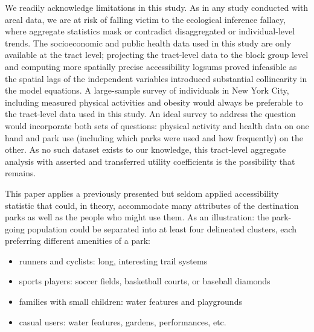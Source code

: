 \documentclass[Crown,sageh.bst]{sagej}
\begin{document}
We readily acknowledge limitations in this study. As in any study
conducted with areal data, we are at risk of falling victim to the
ecological inference fallacy, where aggregate statistics mask or
contradict disaggregated or individual-level trends. The socioeconomic
and public health data used in this study are only available at the
tract level; projecting the tract-level data to the block group level
and computing more spatially precise accessibility logsums proved
infeasible as the spatial lags of the independent variables introduced
substantial collinearity in the model equations. A large-sample survey
of individuals in New York City, including measured physical activities
and obesity would always be preferable to the tract-level data used in
this study. An ideal survey to address the question would incorporate
both sets of questions: physical activity and health data on one hand
and park use (including which parks were used and how frequently) on the
other. As no such dataset exists to our knowledge, this tract-level
aggregate analysis with asserted and transferred utility coefficients is
the possibility that remains.

This paper applies a previously presented but seldom applied
accessibility statistic that could, in theory, accommodate many
attributes of the destination parks as well as the people who might use
them. As an illustration: the park-going population could be separated
into at least four delineated clusters, each preferring different
amenities of a park:

\begin{itemize}
 \item{runners and cyclists: long, interesting trail systems}
 \item{sports players: soccer fields, basketball courts, or baseball diamonds}
 \item{families with small children: water features and playgrounds}
 \item{casual users: water features, gardens, performances, etc.}
\end{itemize}
\end{document}
